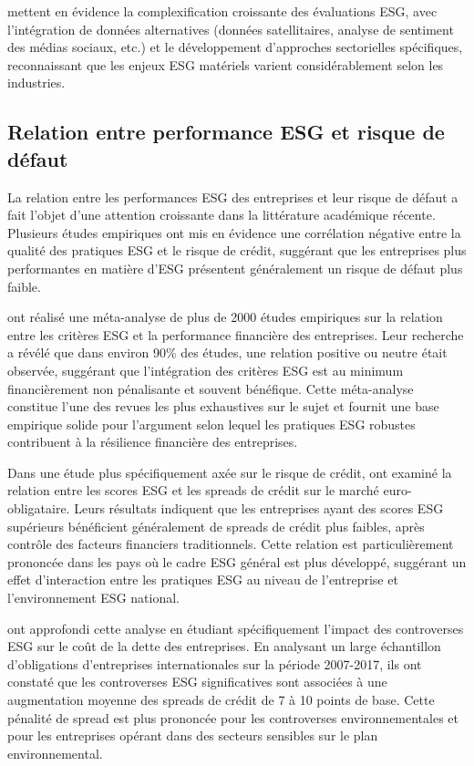 \citet{berg2022} mettent en évidence la complexification croissante des évaluations ESG, avec l'intégration de données alternatives (données satellitaires, analyse de sentiment des médias sociaux, etc.) et le développement d'approches sectorielles spécifiques, reconnaissant que les enjeux ESG matériels varient considérablement selon les industries.

\subsection{Relation entre performance ESG et risque de défaut}

La relation entre les performances ESG des entreprises et leur risque de défaut a fait l'objet d'une attention croissante dans la littérature académique récente. Plusieurs études empiriques ont mis en évidence une corrélation négative entre la qualité des pratiques ESG et le risque de crédit, suggérant que les entreprises plus performantes en matière d'ESG présentent généralement un risque de défaut plus faible.

\citet{friede2015} ont réalisé une méta-analyse de plus de 2000 études empiriques sur la relation entre les critères ESG et la performance financière des entreprises. Leur recherche a révélé que dans environ 90\% des études, une relation positive ou neutre était observée, suggérant que l'intégration des critères ESG est au minimum financièrement non pénalisante et souvent bénéfique. Cette méta-analyse constitue l'une des revues les plus exhaustives sur le sujet et fournit une base empirique solide pour l'argument selon lequel les pratiques ESG robustes contribuent à la résilience financière des entreprises.

Dans une étude plus spécifiquement axée sur le risque de crédit, \citet{stellner2015} ont examiné la relation entre les scores ESG et les spreads de crédit sur le marché euro-obligataire. Leurs résultats indiquent que les entreprises ayant des scores ESG supérieurs bénéficient généralement de spreads de crédit plus faibles, après contrôle des facteurs financiers traditionnels. Cette relation est particulièrement prononcée dans les pays où le cadre ESG général est plus développé, suggérant un effet d'interaction entre les pratiques ESG au niveau de l'entreprise et l'environnement ESG national.

\citet{capelle2019} ont approfondi cette analyse en étudiant spécifiquement l'impact des controverses ESG sur le coût de la dette des entreprises. En analysant un large échantillon d'obligations d'entreprises internationales sur la période 2007-2017, ils ont constaté que les controverses ESG significatives sont associées à une augmentation moyenne des spreads de crédit de 7 à 10 points de base. Cette pénalité de spread est plus prononcée pour les controverses environnementales et pour les entreprises opérant dans des secteurs sensibles sur le plan environnemental.

